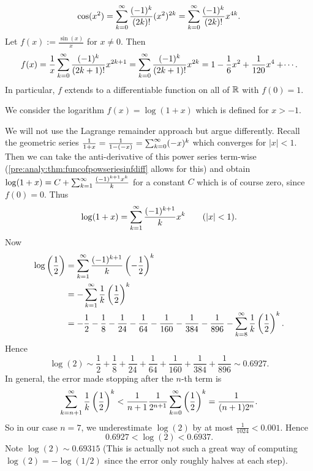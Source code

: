 \documentclass[10pt, a4paper]{article}
\newcommand{\infsumo}{\infsum[k = 0]}
\begin{document}
\begin{example}
    \[
    \cos(x ^ 2) = \infsumo\frac{(-1) ^ k}{(2k)!}(x ^ 2) ^ {2k} = \infsumo\frac{(-1) ^ k}{(2k)!}x ^ {4k}.
    \]
    Let $f(x) := \frac{\sin(x)}{x}$ for $x \neq 0$.
    Then
    \[
    f(x) = \frac{1}{x}\infsumo\frac{(-1) ^ k}{(2k + 1)!}x ^ {2k + 1} = \infsumo\frac{(-1) ^ k}{(2k + 1)!}x ^ {2k} = 1 - \frac{1}{6}x ^ 2 + \frac{1}{120}x ^ 4 + \dotsi.
    \]
    In particular,
    $f$ extends to a differentiable function on all of $\R$ with $f(0) = 1$.
\end{example}

\begin{example}[Logarithm]
    We consider the logarithm $f(x) = \log(1 + x)$ which is defined for $x > -1$.

    We will not use the Lagrange remainder approach but argue differently.
    Recall the geometric series $\frac{1}{1 + x} = \frac{1}{1 - (-x)} = \infsumo(-x) ^ k$ which converges for $|x| < 1$.
    Then we can take the anti-derivative of this power series term-wise
    (\autoref{pre:analy:thm:funcofpowseriesinfdiff} allows for this)
    and obtain $\log(1 + x) = C + \infsum\frac{(-1) ^ {k + 1}x ^ k}{k}$ for a constant $C$ which is of course zero,
    since $f(0) = 0$.
    Thus
    \[
    \log(1 + x) = \infsum\frac{(-1) ^ {k + 1}}{k}x ^ k\qquad(|x| < 1).
    \]
    Now
    \begin{align*}
        \log\left(\frac{1}{2}\right) &= \infsum\frac{(-1) ^ {k + 1}}{k}\left(-\frac{1}{2}\right) ^ k \\
        &= -\infsum\frac{1}{k}\left(\frac{1}{2}\right) ^ k \\
        &= -\frac{1}{2} - \frac{1}{8} - \frac{1}{24} - \frac{1}{64} - \frac{1}{160} - \frac{1}{384} - \frac{1}{896} - \infsum[k = 8]\frac{1}{k}\left(\frac{1}{2}\right) ^ k.
    \end{align*}
    Hence
    \[
    \log(2) \sim \frac{1}{2} + \frac{1}{8} + \frac{1}{24} + \frac{1}{64} + \frac{1}{160} + \frac{1}{384} + \frac{1}{896} \sim 0.6927.
    \]
    In general,
    the error made stopping after the $n$-th term is
    \[
    \infsum[k = n + 1]\frac{1}{k}\left(\frac{1}{2}\right) ^ k < \frac{1}{n + 1}\frac{1}{2 ^ {n + 1}}\infsumo\left(\frac{1}{2}\right) ^ k = \frac{1}{(n + 1)2 ^ n}.
    \]
    So in our case $n = 7$,
    we underestimate $\log(2)$ by at most $\frac{1}{1024} < 0.001$.
    Hence
    \[
    0.6927 < \log(2) < 0.6937.
    \]
    Note $\log(2) \sim 0.69315$
    (This is actually not such a great way of computing $\log(2) = -\log(1 / 2)$ since the error only roughly halves at each step).
    

\end{example}
\end{document}

